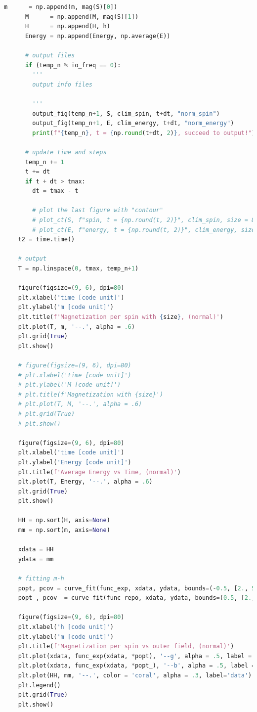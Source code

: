 \documentclass[10pt]{article}
\begin{document}
\begin{lstlisting}[language={Python}]
      m      = np.append(m, mag(S)[0])
      M      = np.append(M, mag(S)[1])
      H      = np.append(H, h)
      Energy = np.append(Energy, np.average(E))

      # output files
      if (temp_n % io_freq == 0):
        '''
        output info files

        '''
        output_fig(temp_n+1, S, clim_spin, t+dt, "norm_spin")
        output_fig(temp_n+1, E, clim_energy, t+dt, "norm_energy")
        print(f"{temp_n}, t = {np.round(t+dt, 2)}, succeed to output!")

      # update time and steps
      temp_n += 1
      t += dt
      if t + dt > tmax:
        dt = tmax - t

        # plot the last figure with "contour"
        # plot_ct(S, f"spin, t = {np.round(t, 2)}", clim_spin, size = 8, dpi = 80)
        # plot_ct(E, f"energy, t = {np.round(t, 2)}", clim_energy, size = 8, dpi = 80)
    t2 = time.time()
    
    # output
    T = np.linspace(0, tmax, temp_n+1)
    
    figure(figsize=(9, 6), dpi=80)
    plt.xlabel('time [code unit]')
    plt.ylabel('m [code unit]')
    plt.title(f'Magnetization per spin with {size}, (normal)')
    plt.plot(T, m, '--.', alpha = .6)
    plt.grid(True)
    plt.show()
    
    # figure(figsize=(9, 6), dpi=80)
    # plt.xlabel('time [code unit]')
    # plt.ylabel('M [code unit]')
    # plt.title(f'Magnetization with {size}')
    # plt.plot(T, M, '--.', alpha = .6)
    # plt.grid(True)
    # plt.show()
    
    figure(figsize=(9, 6), dpi=80)
    plt.xlabel('time [code unit]')
    plt.ylabel('Energy [code unit]')
    plt.title(f'Average Energy vs Time, (normal)')
    plt.plot(T, Energy, '--.', alpha = .6)
    plt.grid(True)
    plt.show()
    
    HH = np.sort(H, axis=None)
    mm = np.sort(m, axis=None)

    xdata = HH
    ydata = mm
    
    # fitting m-h
    popt, pcov = curve_fit(func_exp, xdata, ydata, bounds=(-0.5, [2., 50., 2., 1.]))
    popt_, pcov_ = curve_fit(func_repo, xdata, ydata, bounds=(0.5, [2., 10., 2., 1.]), p0=([2,5,1,0.6])) 
    
    figure(figsize=(9, 6), dpi=80)
    plt.xlabel('h [code unit]')
    plt.ylabel('m [code unit]')
    plt.title(f'Magnetization per spin vs outer field, (normal)')
    plt.plot(xdata, func_exp(xdata, *popt), '--g', alpha = .5, label = f'exp fit with \n popt = {np.round(popt, 2)}')
    plt.plot(xdata, func_exp(xdata, *popt_), '--b', alpha = .5, label = f'reciprocal fit with \n popt = {np.round(popt_,2)}')
    plt.plot(HH, mm, '--.', color = 'coral', alpha = .3, label='data')
    plt.legend()
    plt.grid(True)
    plt.show()


\end{lstlisting}
\end{document}
